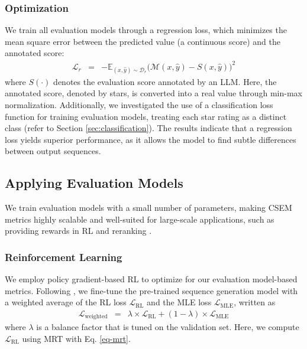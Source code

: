 \documentclass[lettersize,journal]{IEEEtran}
\begin{document}
\subsubsection{Optimization}
We train all evaluation models through a regression loss, which minimizes the mean square error between the predicted value (a continuous score) and the annotated score:
\begin{eqnarray}
    \mathcal{L}_{r} &=& - \mathbb{E}_{(x,\hat{y})\sim \mathcal{D}_{r}}\big(\mathcal{M}(x, \hat{y})- S(x, \hat{y})\big)^2
\end{eqnarray}
where $S(\cdot)$ denotes the evaluation score annotated by an LLM. Here, the annotated score, denoted by stars, is converted into a real value through min-max normalization. Additionally, we investigated the use of a classification loss function for training evaluation models, treating each star rating as a distinct class (refer to Section \ref{sec:classification}). The results indicate that a regression loss yields superior performance, as it allows the model to find subtle differences between output sequences.



\subsection{Applying Evaluation Models}
\label{sec:apply}
We train evaluation models with a small number of parameters, making CSEM metrics highly scalable and well-suited for large-scale applications, such as providing rewards in RL and reranking \cite{he2024improving}.


\subsubsection{Reinforcement Learning}
We employ policy gradient-based RL to optimize for our evaluation model-based metrics.
Following \cite{yehudai2022reinforcement}, we fine-tune the pre-trained sequence generation model with a weighted average of the RL loss $\mathcal{L}_{\mathrm{RL}}$ and the MLE loss $\mathcal{L}_{\mathrm{MLE}}$,  written as
\begin{eqnarray}
    \mathcal{L}_{\mathrm{weighted}} &=& \lambda\times\mathcal{L}_{\mathrm{RL}}+(1-\lambda)\times\mathcal{L}_{\mathrm{MLE}}
    \label{eq:rl-loss}
\end{eqnarray}
where $\lambda$ is a balance factor that is tuned on the validation set.
Here, we compute $\mathcal{L}_{\mathrm{RL}}$ using MRT with Eq. \ref{eq-mrt}. 
\end{document}
